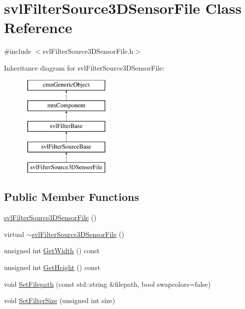 \hypertarget{classsvl_filter_source3_d_sensor_file}{}\section{svl\+Filter\+Source3\+D\+Sensor\+File Class Reference}
\label{classsvl_filter_source3_d_sensor_file}


{\ttfamily \#include $<$svl\+Filter\+Source3\+D\+Sensor\+File.\+h$>$}

Inheritance diagram for svl\+Filter\+Source3\+D\+Sensor\+File\+:\begin{figure}[H]
\begin{center}
\leavevmode
\includegraphics[height=5.000000cm]{d5/da1/classsvl_filter_source3_d_sensor_file}
\end{center}
\end{figure}
\subsection*{Public Member Functions}
\begin{DoxyCompactItemize}
\item 
\hyperlink{classsvl_filter_source3_d_sensor_file_a6788eff6e16a3736c2f711ee91d4d53e}{svl\+Filter\+Source3\+D\+Sensor\+File} ()
\item 
virtual \hyperlink{classsvl_filter_source3_d_sensor_file_a7138e29f06e2f4c62052fd26565ef501}{$\sim$svl\+Filter\+Source3\+D\+Sensor\+File} ()
\item 
unsigned int \hyperlink{classsvl_filter_source3_d_sensor_file_a695a04ddca590ff102dea09d03fffd25}{Get\+Width} () const 
\item 
unsigned int \hyperlink{classsvl_filter_source3_d_sensor_file_ae7904a9e5d2902f38ca8777b7e894e83}{Get\+Height} () const 
\item 
void \hyperlink{classsvl_filter_source3_d_sensor_file_af7b23ab150e848f1013a24bee859db71}{Set\+Filepath} (const std\+::string \&filepath, bool swapcolors=false)
\item 
void \hyperlink{classsvl_filter_source3_d_sensor_file_ab6cb64664719977309c483928ff3fd6c}{Set\+Filter\+Size} (unsigned int size)
\end{DoxyCompactItemize}
